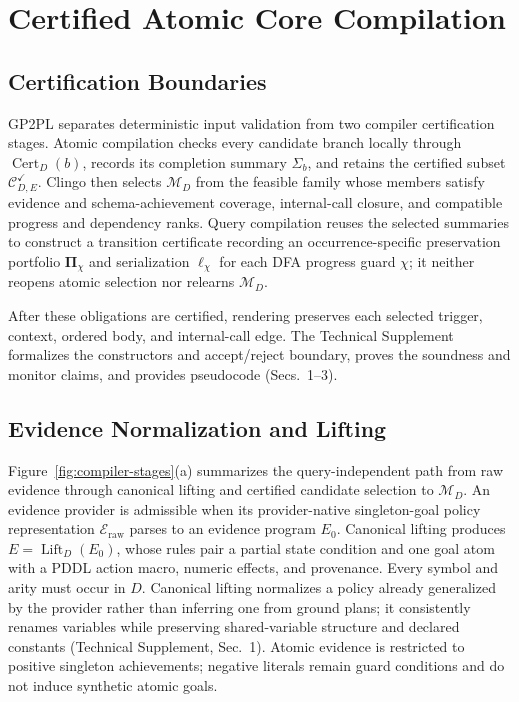 \section{Certified Atomic Core Compilation}
\label{sec:method}

\subsection{Certification Boundaries}

GP2PL separates deterministic input validation from two compiler certification
stages. Atomic compilation checks every candidate branch locally through
$\operatorname{Cert}_D(b)$, records its completion summary $\Sigma_b$, and
retains the certified subset $\mathcal C^{\checkmark}_{D,E}$. Clingo then selects
$\mathcal M_D$ from the feasible family whose members satisfy evidence and
schema-achievement coverage, internal-call closure, and compatible progress and
dependency ranks. Query compilation reuses the selected summaries to construct
a transition certificate recording an occurrence-specific preservation
portfolio $\boldsymbol\Pi_\chi$ and serialization $\boldsymbol\ell_\chi$ for each
DFA progress guard $\chi$; it neither reopens atomic selection nor relearns
$\mathcal M_D$.

After these obligations are certified, rendering preserves each selected trigger,
context, ordered body, and internal-call edge. The Technical Supplement
formalizes the constructors and accept/reject boundary, proves the
soundness and monitor claims, and provides pseudocode (Secs.~1--3).

\subsection{Evidence Normalization and Lifting}

Figure~\ref{fig:compiler-stages}(a) summarizes the query-independent path from
raw evidence through canonical lifting and certified candidate selection to
$\mathcal M_D$.
An evidence provider is admissible when its provider-native singleton-goal
policy representation $\mathcal E_{\mathrm{raw}}$ parses to an evidence program $E_0$.
Canonical lifting produces
$E=\operatorname{Lift}_D(E_0)$, whose rules pair a partial state condition and
one goal atom with a PDDL action macro, numeric effects, and provenance.
Every symbol and arity must occur in $D$. Canonical lifting normalizes a policy
already generalized by the provider rather than inferring one from ground
plans; it consistently renames variables while preserving shared-variable
structure and declared constants (Technical Supplement, Sec.~1). Atomic evidence is
restricted to positive singleton achievements;
negative literals remain guard conditions and do not induce synthetic atomic
goals.

